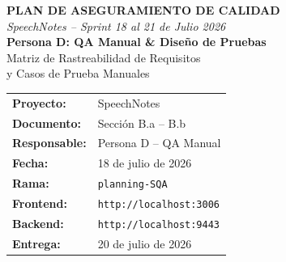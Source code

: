 \documentclass[12pt, a4paper]{article}
\begin{document}
\thispagestyle{empty}


\vspace*{1.8cm}
\begin{center}
  {\color{white}\fontsize{22}{26}\selectfont\textbf{PLAN DE ASEGURAMIENTO DE CALIDAD}}\\[0.3cm]
  {\color{white}\fontsize{16}{20}\selectfont\textit{SpeechNotes -- Sprint 18 al 21 de Julio 2026}}\\[0.5cm]
  {\color{espe-gold}\fontsize{18}{22}\selectfont\textbf{Persona D: QA Manual \& Dise\~no de Pruebas}}\\[1.5cm]
  {\color{white}\large Matriz de Rastreabilidad de Requisitos}\\
  {\color{white}\large y Casos de Prueba Manuales}\\[2cm]
\end{center}

\begin{tcolorbox}[
  enhanced,
  colback=white, colframe=espe-gold, boxrule=1.5pt, arc=6pt,
  width=12cm, center, fontupper=\small
]
  \begin{tabular}{ll}
    \textbf{Proyecto:}    & SpeechNotes \\
    \textbf{Documento:}   & Secci\'on B.a -- B.b \\
    \textbf{Responsable:} & Persona D -- QA Manual \\
    \textbf{Fecha:}       & 18 de julio de 2026 \\
    \textbf{Rama:}        & \texttt{planning-SQA} \\
    \textbf{Frontend:}    & \texttt{http://localhost:3006} \\
    \textbf{Backend:}     & \texttt{http://localhost:9443} \\
    \textbf{Entrega:}     & 20 de julio de 2026 \\
  \end{tabular}
\end{tcolorbox}

\newpage

\tableofcontents
\newpage
\end{document}

